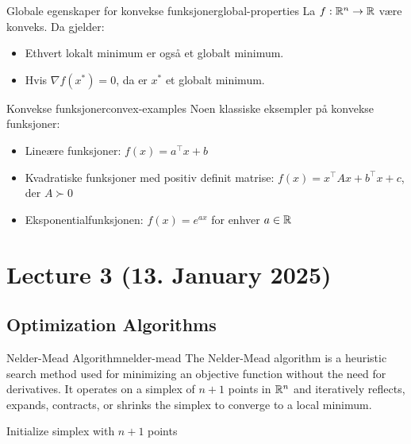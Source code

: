 \begin{theorem}{Globale egenskaper for konvekse funksjoner}{global-properties}
  La  \(f: \mathbb{R}^n \to \mathbb{R}\) være konveks. Da gjelder:
  \begin{itemize}
    \item Ethvert lokalt minimum er også et globalt minimum.
    \item Hvis  \(\nabla f(x^*) = 0\), da er  \(x^*\) et globalt minimum.
  \end{itemize}
\end{theorem}

\begin{example}{Konvekse funksjoner}{convex-examples}
  Noen klassiske eksempler på konvekse funksjoner:
  \begin{itemize}
    \item Lineære funksjoner:  \(f(x) = a^\top x + b\)
    \item Kvadratiske funksjoner med positiv definit matrise:  \(f(x) = x^\top Ax + b^\top x + c\), der  \(A \succ 0\)
    \item Eksponentialfunksjonen:  \(f(x) = e^{ax}\) for enhver  \(a \in \mathbb{R}\)
  \end{itemize}
\end{example}

\section{Lecture 3 (13. January 2025)}
\subsection*{Optimization Algorithms}

\begin{definition}{Nelder-Mead Algorithm}{nelder-mead}
  The Nelder-Mead algorithm is a heuristic search method used for minimizing an objective function without the need for derivatives. It operates on a simplex of \( n+1 \) points in \( \mathbb{R}^n \) and iteratively reflects, expands, contracts, or shrinks the simplex to converge to a local minimum.

\end{definition}

\begin{algorithm}[H]
  \caption{Nelder-Mead Algorithm}
  \label{alg:nelder-mead}
  Initialize simplex with  \(n+1\) points\;
\end{algorithm}

